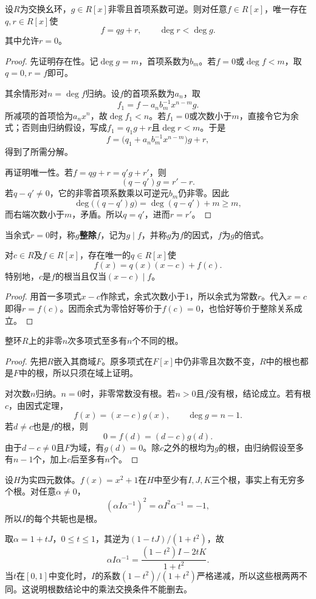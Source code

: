 \begin{theorem}\label{p2:poly-division}
设$R$为交换幺环，$g\in R[x]$非零且首项系数可逆。则对任意$f\in R[x]$，唯一存在$q,r\in R[x]$使
\[
f=qg+r,\qquad \deg r<\deg g.
\]
其中允许$r=0$。
\end{theorem}
\begin{proof}
先证明存在性。记$\deg g=m$，首项系数为$b_m$。若$f=0$或$\deg f<m$，取$q=0,r=f$即可。

其余情形对$n=\deg f$归纳。设$f$的首项系数为$a_n$，取
\[
f_1=f-a_nb_m^{-1}x^{n-m}g.
\]
所减项的首项恰为$a_nx^n$，故$\deg f_1<n$。若$f_1=0$或次数小于$m$，直接令它为余式；否则由归纳假设，写成$f_1=q_1g+r$且$\deg r<m$。于是
\[
f=\bigl(q_1+a_nb_m^{-1}x^{n-m}\bigr)g+r,
\]
得到了所需分解。

再证明唯一性。若$f=qg+r=q'g+r'$，则
\[
(q-q')g=r'-r.
\]
若$q-q'\ne0$，它的非零首项系数乘以可逆元$b_m$仍非零。因此
\[
\deg\bigl((q-q')g\bigr)=\deg(q-q')+m\ge m,
\]
而右端次数小于$m$，矛盾。所以$q=q'$，进而$r=r'$。
\end{proof}

当余式$r=0$时，称$g$\textbf{整除}$f$，记为$g\mid f$，并称$g$为$f$的因式，$f$为$g$的倍式。

\begin{corollary}
对$c\in R$及$f\in R[x]$，存在唯一的$q\in R[x]$使
\[
f(x)=q(x)(x-c)+f(c).
\]
特别地，$c$是$f$的根当且仅当$(x-c)\mid f$。
\end{corollary}
\begin{proof}
用首一多项式$x-c$作除式，余式次数小于$1$，所以余式为常数$r$。代入$x=c$即得$r=f(c)$。因而余式为零恰好等价于$f(c)=0$，也恰好等价于整除关系成立。
\end{proof}

\begin{theorem}\label{p2:poly-roots}
整环$R$上的非零$n$次多项式至多有$n$个不同的根。
\end{theorem}
\begin{proof}
先把$R$嵌入其商域$F$。原多项式在$F[x]$中仍非零且次数不变，$R$中的根也都是$F$中的根，所以只须在域上证明。

对次数$n$归纳。$n=0$时，非零常数没有根。若$n>0$且$f$没有根，结论成立。若有根$c$，由因式定理，
\[
f(x)=(x-c)g(x),\qquad\deg g=n-1.
\]
若$d\ne c$也是$f$的根，则
\[
0=f(d)=(d-c)g(d).
\]
由于$d-c\ne0$且$F$为域，有$g(d)=0$。除$c$之外的根均为$g$的根，由归纳假设至多有$n-1$个，加上$c$后至多有$n$个。
\end{proof}

\begin{example}
设$H$为实四元数体。$f(x)=x^2+1$在$H$中至少有$I,J,K$三个根，事实上有无穷多个根。对任意$\alpha\ne0$，
\[
(\alpha I\alpha^{-1})^2
=\alpha I^2\alpha^{-1}=-1,
\]
所以$I$的每个共轭也是根。

取$\alpha=1+tJ$，$0\le t\le1$，其逆为$(1-tJ)/(1+t^2)$，故
\[
\alpha I\alpha^{-1}
=\frac{(1-t^2)I-2tK}{1+t^2}.
\]
当$t$在$[0,1]$中变化时，$I$的系数$(1-t^2)/(1+t^2)$严格递减，所以这些根两两不同。这说明根数结论中的乘法交换条件不能删去。
\end{example}

